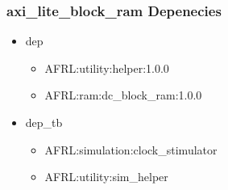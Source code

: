 \subsubsection{axi\_lite\_block\_ram Depenecies}
\begin{itemize}
\item dep
	\begin{itemize}
	\item AFRL:utility:helper:1.0.0
	\item AFRL:ram:dc\_block\_ram:1.0.0
	\end{itemize}
\item dep\_tb
	\begin{itemize}
	\item AFRL:simulation:clock\_stimulator
	\item AFRL:utility:sim\_helper
	\end{itemize}
\end{itemize}
